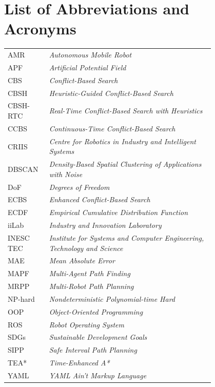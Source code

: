 \chapter*{List of Abbreviations and Acronyms}

\begin{flushleft}
\begin{tabular}{l p{0.8\linewidth}}
AMR       & \emph{Autonomous Mobile Robot} \\
APF       & \emph{Artificial Potential Field} \\
CBS       & \emph{Conflict-Based Search} \\
CBSH      & \emph{Heuristic-Guided Conflict-Based Search} \\
CBSH-RTC  & \emph{Real-Time Conflict-Based Search with Heuristics} \\
CCBS      & \emph{Continuous-Time Conflict-Based Search} \\
CRIIS     & \emph{Centre for Robotics in Industry and Intelligent Systems} \\
DBSCAN    & \emph{Density-Based Spatial Clustering of Applications with Noise} \\
DoF       & \emph{Degrees of Freedom} \\
ECBS      & \emph{Enhanced Conflict-Based Search} \\
ECDF      & \emph{Empirical Cumulative Distribution Function} \\
iiLab     & \emph{Industry and Innovation Laboratory} \\
INESC TEC & \emph{Institute for Systems and Computer Engineering, Technology and Science} \\
MAE       & \emph{Mean Absolute Error} \\
MAPF      & \emph{Multi-Agent Path Finding} \\
MRPP      & \emph{Multi-Robot Path Planning} \\
NP-hard   & \emph{Nondeterministic Polynomial-time Hard} \\
OOP       & \emph{Object-Oriented Programming} \\
ROS       & \emph{Robot Operating System} \\
SDGs      & \emph{Sustainable Development Goals} \\
SIPP      & \emph{Safe Interval Path Planning} \\
TEA*      & \emph{Time-Enhanced A*} \\
YAML      & \emph{YAML Ain't Markup Language} \\
\end{tabular}
\end{flushleft}